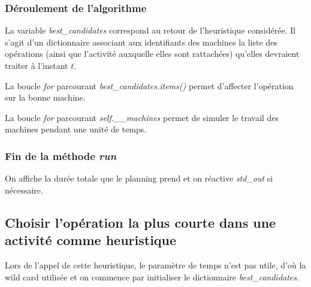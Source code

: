 

\newpage

\subsubsection{Déroulement de l'algorithme}



La variable \textit{best\_candidates} correspond au retour de l'heuristique considérée. Il s'agit d'un dictionnaire associant aux identifiants des machines la liste des opérations (ainsi que l'activité auxquelle elles sont rattachées) qu'elles devraient traiter à l'instant $t$.

La boucle \textit{for} parcourant \textit{best\_candidates.items()} permet d'affecter l'opération sur la bonne machine.

La boucle \textit{for} parcourant \textit{self.\_\_machines} permet de simuler le travail des machines pendant une unité de temps.

\subsubsection{Fin de la méthode \textit{run}}



On affiche la durée totale que le planning prend et on réactive \textit{std\_out} si nécessaire. 

\newpage

\subsection{Choisir l'opération la plus courte dans une activité comme heuristique}



Lors de l'appel de cette heuristique, le paramètre de temps n'est pas utile, d'où la wild card utilisée et on commence par initialiser le dictionnaire \textit{best\_candidates}.



